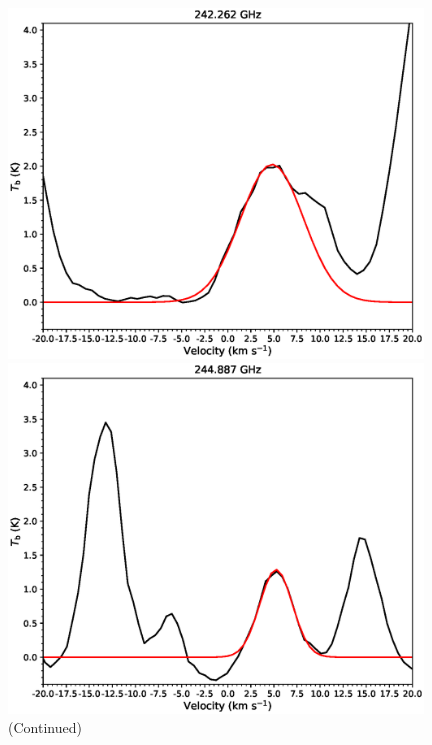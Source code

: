 \begin{figure}[H]
\begin{center}
\begin{minipage}{0.98\textwidth} 
\begin{center}
\begin{minipage}{0.48\textwidth}
\begin{center}
\includegraphics[width=0.98\textwidth]{OrionKL/spectrum/HC/242.2620195w_fit.eps}
\end{center}
\end{minipage}
\begin{minipage}{0.48\textwidth}
\begin{center}
\includegraphics[width=0.98\textwidth]{OrionKL/spectrum/HC/244.8869007w_fit.eps}
\end{center}
\end{minipage}
\end{center}
\end{minipage}

\caption{(Continued)}
\end{center}
\end{figure}


